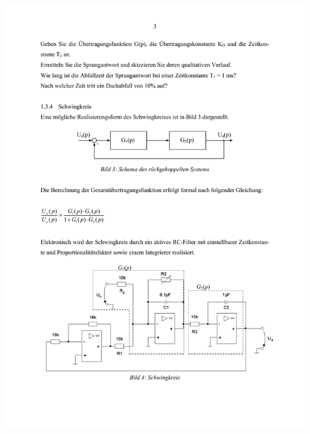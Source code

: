 \includegraphics[width=1.0\textwidth]{Bilder/Grundubertragungsglieder im Zeitbereich (verschoben) 3}\newpage
